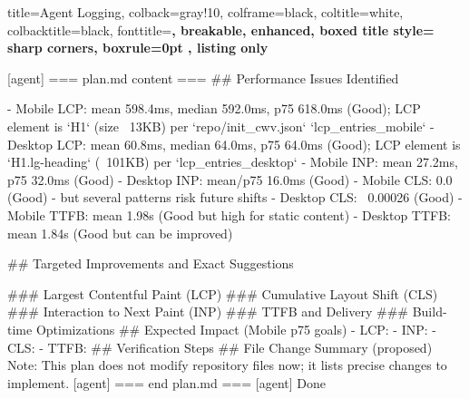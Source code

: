 \begin{tcblisting}{
  title=Agent Logging,
  colback=gray!10,
  colframe=black,
  coltitle=white,
  colbacktitle=black,
  fonttitle=\bfseries,
  breakable,
  enhanced,
  boxed title style={
    sharp corners,
    boxrule=0pt
  },
  listing only
}

[agent] === plan.md content ===
## Performance Issues Identified

- Mobile LCP: mean 598.4ms, median 592.0ms, p75 618.0ms (Good); LCP element is `H1` (size ~13KB) per `repo/init_cwv.json` `lcp_entries_mobile`
- Desktop LCP: mean 60.8ms, median 64.0ms, p75 64.0ms (Good); LCP element is `H1.lg-heading` (~101KB) per `lcp_entries_desktop`
- Mobile INP: mean 27.2ms, p75 32.0ms (Good)
- Desktop INP: mean/p75 16.0ms (Good)
- Mobile CLS: 0.0 (Good) - but several patterns risk future shifts
- Desktop CLS: ~0.00026 (Good)
- Mobile TTFB: mean 1.98s (Good but high for static content)
- Desktop TTFB: mean 1.84s (Good but can be improved)

## Targeted Improvements and Exact Suggestions

### Largest Contentful Paint (LCP)
### Cumulative Layout Shift (CLS)
### Interaction to Next Paint (INP)
### TTFB and Delivery
### Build-time Optimizations
## Expected Impact (Mobile p75 goals)
- LCP: 
- INP: 
- CLS: 
- TTFB:
## Verification Steps
## File Change Summary (proposed)
Note: This plan does not modify repository files now; it lists precise changes to implement.
[agent] === end plan.md ===
[agent] Done

\end{tcblisting}












